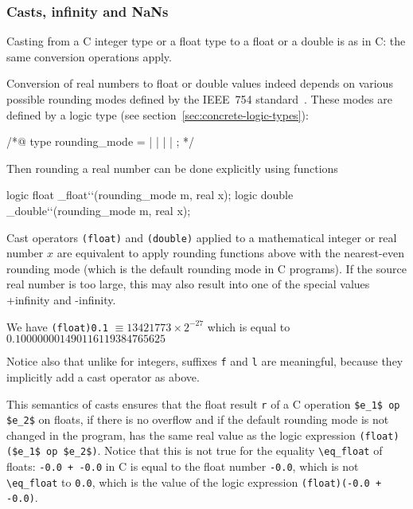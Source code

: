 \subsubsection{Casts, infinity and NaNs}

Casting from a C integer type or a float type to a float
or a double is as in C: the same conversion operations apply.

Conversion of real numbers to float or double values indeed depends on
various possible rounding modes defined by the IEEE~754
standard~\cite{float-std,wikipedia-float}. These modes are defined by
a logic type (see section~\ref{sec:concrete-logic-types}):
\begin{listing-nonumber}
/*@ type rounding_mode = \Up | \Down | \ToZero | \NearestAway | \NearestEven;
*/
\end{listing-nonumber}
Then rounding a real number can be done explicitly using functions
\begin{listing-nonumber}
  logic float \round_float``(rounding_mode m, real x);
  logic double \round_double``(rounding_mode m, real x);
\end{listing-nonumber}
Cast operators \lstinline|(float)| and \lstinline|(double)| applied to a
mathematical integer or real number $x$ are equivalent to apply
rounding functions above with the nearest-even rounding mode (which is
the default rounding mode in C programs).
If the source real number is too large, this may also result into one
of the special values +infinity and -infinity.
\begin{example}
  We have
  \lstinline|(float)0.1| $\equiv 13421773 \times 2 ^{-27}$ which is equal to
  $0.100000001490116119384765625$
\end{example}
Notice also that unlike for integers, suffixes \lstinline|f| and
\lstinline|l| are
meaningful, because they implicitly add a cast operator as above.

This semantics of casts ensures that the float result \lstinline|r| of
a C operation \lstinline|$e_1$ op $e_2$| on floats, if there is no
overflow and if the default
rounding mode is not changed in the program, has the same real value
as the logic expression \lstinline|(float)($e_1$ op $e_2$)|. Notice
that this is not
true for the equality \lstinline|\eq_float| of floats: \lstinline|-0.0 + -0.0|
in C is equal to the float number \lstinline|-0.0|, which is not
\lstinline|\eq_float| to \lstinline|0.0|, which is the value of the logic
expression \lstinline|(float)(-0.0 + -0.0)|.

